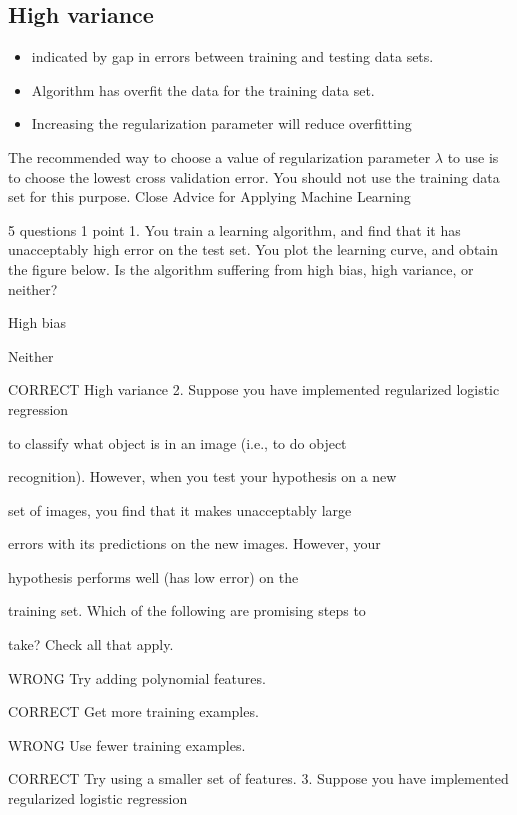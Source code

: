 


\subsection*{High variance}

\begin{itemize}
\item indicated by gap in errors between training and testing data sets.
\item Algorithm has overfit the data for the training data set.
\item Increasing the regularization parameter will reduce overfitting
\end{itemize}
The recommended way to choose a value of regularization parameter $\lambda$ to use is to choose
the lowest cross validation error.
You should not use the training data set for this purpose.
Close
Advice for Applying Machine Learning

5 questions
1
point
1. 
You train a learning algorithm, and find that it has unacceptably high error on the test set. You plot the learning curve, and obtain the figure below. Is the algorithm suffering from high bias, high variance, or neither?



High bias

Neither

CORRECT High variance 
2. 
Suppose you have implemented regularized logistic regression

to classify what object is in an image (i.e., to do object

recognition). However, when you test your hypothesis on a new

set of images, you find that it makes unacceptably large

errors with its predictions on the new images. However, your

hypothesis performs well (has low error) on the

training set. Which of the following are promising steps to

take? Check all that apply.

WRONG Try adding polynomial features.

CORRECT Get more training examples.

WRONG Use fewer training examples.

CORRECT Try using a smaller set of features.
3. 
Suppose you have implemented regularized logistic regression

